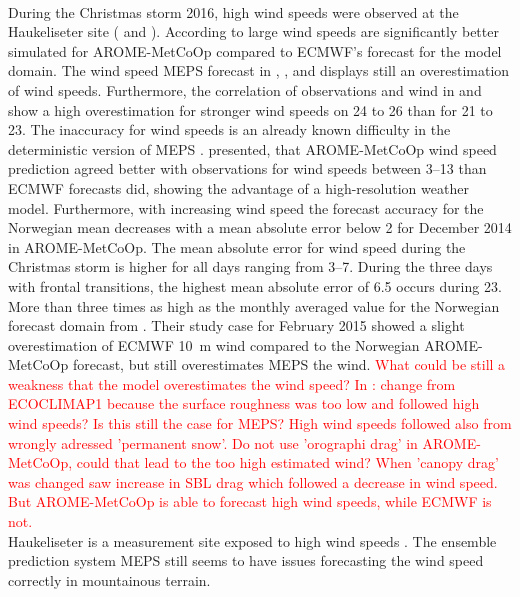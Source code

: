 \\
During the Christmas storm 2016, high wind speeds were observed at the Haukeliseter site ( and ).
According to \citet{muller_arome-metcoop:_2017} large wind speeds are significantly better simulated for AROME-MetCoOp compared to ECMWF's forecast for the model domain. The wind speed MEPS forecast in , , and  displays still an overestimation of wind speeds. Furthermore, the correlation of observations and wind in  and  show a high overestimation for stronger wind speeds on \num{24} to \SI{26}{\dec} than for \num{21} to \SI{23}{\dec}. The inaccuracy for wind speeds is an already known difficulty in the deterministic version of MEPS \citep{muller_arome-metcoop:_2017}. \citet{muller_arome-metcoop:_2017} presented, that AROME-MetCoOp wind speed prediction agreed better with observations for wind speeds between \SIrange{3}{13}{\mPs} than ECMWF forecasts did, showing the advantage of a high-resolution weather model. Furthermore, with increasing wind speed the forecast accuracy for the Norwegian mean decreases with a mean absolute error below \SI{2}{\mPs} for December 2014 in AROME-MetCoOp.
The mean absolute error for wind speed during the Christmas storm is higher for all days ranging from \SIrange{3}{7}{\mPs}.
During the three days with frontal transitions, the highest mean absolute error of \SI{6.5}{\mPs} occurs during \SI{23}{\dec}. More than three times as high as the monthly averaged value for the Norwegian forecast domain from \citet{muller_arome-metcoop:_2017}. Their study case for February 2015 showed a slight overestimation of ECMWF \SI{10}{\metre} wind compared to the Norwegian AROME-MetCoOp forecast, but still overestimates MEPS the wind.
\textcolor{red}{What could be still a weakness that the model overestimates the wind speed? In \citet{muller_arome-metcoop:_2017}: change from ECOCLIMAP1 because the surface roughness was too low and followed high wind speeds? Is this still the case for MEPS? High wind speeds followed also from wrongly adressed 'permanent snow'. Do not use 'orographi drag' in AROME-MetCoOp, could that lead to the too high estimated wind? When 'canopy drag' was changed saw increase in SBL drag which followed a decrease in wind speed. But AROME-MetCoOp is able to forecast high wind speeds, while ECMWF is not.}
\\
Haukeliseter is a measurement site exposed to high wind speeds \citep{wolff_measurements_2013,wolff_derivation_2015}. The ensemble prediction system MEPS still seems to have issues forecasting the wind speed correctly in mountainous terrain.
